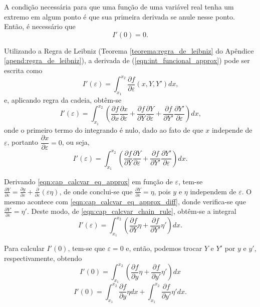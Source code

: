 A condição necessária para que uma função de uma variável real tenha um extremo em algum ponto é que sua primeira derivada se anule nesse ponto. Então, é necessário que
\begin{equation}\label{eqn:cap_calcvar_condition}
I'(0)=0\text{.}
\end{equation}

Utilizando a Regra de Leibniz (Teorema \ref{teorema:regra_de_leibniz} do Apêndice \ref{apend:regra_de_leibniz}), a derivada de (\ref{eqn:int_funcional_approx}) pode ser escrita como
$$I'(\varepsilon)=\int_{x_1}^{x_2} \frac{\partial f}{\partial \varepsilon} (x, Y, Y') dx \text{,}$$
e, aplicando regra da cadeia, obtêm-se
$$I'(\varepsilon)=\int_{x_1}^{x_2}\left ( \frac{\partial f}{\partial x}\frac{\partial x}{\partial \varepsilon} + \frac{\partial f}{\partial Y} \frac{\partial Y}{\partial \varepsilon} + \frac{\partial f}{\partial Y'} \frac{\partial Y'}{\partial \varepsilon} \right )dx\text{,}$$
onde o primeiro termo do integrando é nulo, dado ao fato de que $x$ independe de $\varepsilon$, portanto $\dfrac{\partial x}{\partial \varepsilon}=0$, ou seja,
\begin{equation}\label{eqn:cap_calcvar_chain_rule}
I'(\varepsilon)=\int_{x_1}^{x_2}\left ( \frac{\partial f}{\partial Y}\frac{\partial Y}{\partial \varepsilon} + \frac{\partial f}{\partial Y'}\frac{\partial Y'}{\partial \varepsilon} \right ) dx \text{.}
\end{equation}

Derivando \eqref{eqn:cap_calcvar_eq_approx} em função de $\varepsilon$, tem-se $\frac{\partial Y}{\partial \varepsilon}=\frac{\partial y}{\partial \varepsilon}+\frac{\partial}{\partial \varepsilon}(\varepsilon \eta)$, de onde conclui-se que $\frac{\partial Y}{\partial \varepsilon}=\eta$, pois $y$ e $\eta$ independem de $\varepsilon$. O mesmo acontece com \eqref{eqn:cap_calcvar_eq_approx_diff}, donde verifica-se que $\frac{\partial Y'}{\partial \varepsilon}=\eta'$. Deste modo, de \eqref{eqn:cap_calcvar_chain_rule}, obtêm-se a integral
$$I'(\varepsilon)=\int_{x_1}^{x_2}\left ( 
	\frac{\partial f}{\partial Y} \eta +
	\frac{\partial f}{\partial Y'} \eta '
\right )dx \text{.}
$$

Para calcular $I'(0)$, tem-se que $\varepsilon=0$ e, então, podemos trocar $Y$ e $Y'$ por $y$ e $y'$, respectivamente, obtendo
$$
I'(0)=\int_{x_1}^{x_2}\left (
	\frac{\partial f}{\partial y} \eta +
	\frac{\partial f}{\partial y'} \eta '
\right )dx
$$
$$
I'(0)=
	\int_{x_1}^{x_2} \frac{\partial f}{\partial y}\eta dx
	+
	\int_{x_1}^{x_2} \frac{\partial f}{\partial y'}\eta' dx \text{.}
$$

